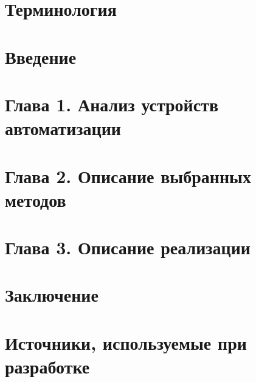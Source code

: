 \documentclass[
encoding=utf8
]{./twoeskd}
\newcommand{\+}{\discretionary{\mbox{\scriptsize$\hookleftarrow$}}{}{}}
\begin{document}



\newpage
{}
\tableofcontents

\setcounter{secnumdepth}{0}

\newpage
\section{Терминология}


\newpage
\section{Введение}


\setcounter{secnumdepth}{3}

\newpage
\section{Глава 1. Анализ устройств автоматизации}


\newpage
\section{Глава 2. Описание выбранных методов}


\newpage
\section{Глава 3. Описание реализации}


\newpage
\section{Заключение}


\newpage
\section{Источники, используемые при разработке}


\newpage

\eskdListOfChanges



\end{document}
